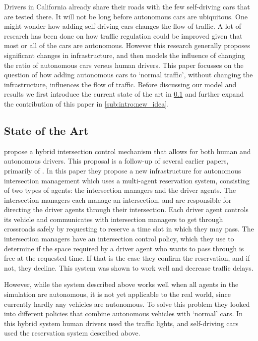 Drivers in California already share their roads with the few self-driving cars that are tested there. It will not be long before autonomous cars are ubiquitous. One might wonder how adding self-driving cars changes the flow of traffic. A lot of research has been done on how traffic regulation could be improved given that most or all of the cars are autonomous. However this research generally proposes significant changes in infrastructure, and then models the influence of changing the ratio of autonomous cars versus human drivers. This paper focusses on the question of how adding autonomous cars to `normal traffic', without changing the infrastructure, influences the flow of traffic. Before discussing our model and results we first introduce the current state of the art in \cref{sub:intro:state_of_the_art} and further expand the contribution of this paper in \cref{sub:intro:new_idea}.

\subsection{State of the Art}
\label{sub:intro:state_of_the_art}
\textcite{dresner2007sharing} propose a hybrid intersection control mechanism that allows for both human and autonomous drivers. This proposal is a follow-up of several earlier papers, primarily of \textcite{dresner2005traffic}. In this paper they propose a new infrastructure for autonomous intersection management which uses a multi-agent reservation system, consisting of two types of agents: the intersection managers and the driver agents. The intersection managers each manage an intersection, and are responsible for directing the driver agents through their intersection. Each driver agent controls its vehicle and communicates with intersection managers to get through crossroads safely by requesting to reserve a time slot in which they may pass. The intersection managers have an intersection control policy, which they use to determine if the space required by a driver agent who wants to pass through is free at the requested time. If that is the case they confirm the reservation, and if not, they decline. This system was shown to work well and decrease traffic delays. 

However, while the system described above works well when all agents in the simulation are autonomous, it is not yet applicable to the real world, since currently hardly any vehicles are autonomous. To solve this problem they looked into different policies that combine autonomous vehicles with `normal' cars. In this hybrid system human drivers used the traffic lights, and self-driving cars used the reservation system described above.

